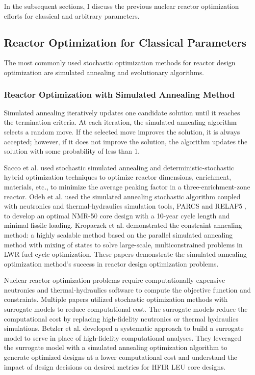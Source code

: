 In the subsequent sections, I discuss the previous nuclear reactor optimization 
efforts for classical and arbitrary parameters.

\subsection{Reactor Optimization for Classical Parameters}
The most commonly used stochastic optimization methods for reactor design 
optimization are simulated annealing and evolutionary algorithms. 

\subsubsection{Reactor Optimization with Simulated Annealing Method}
Simulated annealing iteratively updates one candidate solution until it reaches 
the termination criteria. 
At each iteration, the simulated annealing algorithm selects a random move. 
If the selected move improves the solution, it is always accepted; however,  
if it does not improve the solution, the algorithm updates the solution with 
some probability of less than 1.

Sacco et al. \cite{sacco_two_2006,sacco_metropolis_2008} used stochastic 
simulated annealing and deterministic-stochastic hybrid optimization techniques 
to optimize reactor dimensions, enrichment, materials, etc., to 
minimize the average peaking factor in a three-enrichment-zone reactor. 
Odeh et al. \cite{odeh_core_2016} used the simulated annealing stochastic algorithm 
coupled with neutronics and thermal-hydraulics simulation tools, \gls{PARCS} and RELAP5
\cite{fletcher_relap5mod3_1992}, to develop an optimal \gls{NMR-50} core design 
with a 10-year cycle length and minimal fissile loading. 
Kropaczek et al. \cite{kropaczek_large-scale_2019} demonstrated the constraint 
annealing method: a highly scalable method based on the parallel simulated annealing 
method with mixing of states \cite{kropaczek_constraint_2019} to solve large-scale, 
multiconstrained problems in \gls{LWR} fuel cycle optimization. 
These papers demonstrate the simulated annealing optimization method's success in 
reactor design optimization problems. 

Nuclear reactor optimization problems require computationally 
expensive neutronics and thermal-hydraulics software to compute the objective 
function and constraints. 
Multiple papers utilized stochastic optimization methods with surrogate models 
to reduce computational cost. 
The surrogate models reduce the computational cost by replacing high-fidelity
neutronics or thermal hydraulics simulations.
Betzler et al. \cite{betzler_design_2019} developed a systematic approach to 
build a surrogate model to serve in place of high-fidelity computational 
analyses. 
They leveraged the surrogate model with a simulated annealing optimization 
algorithm to generate optimized designs at a lower computational cost and
understand the impact of design decisions on desired metrics for \gls{HFIR} \gls{LEU} 
core designs.

